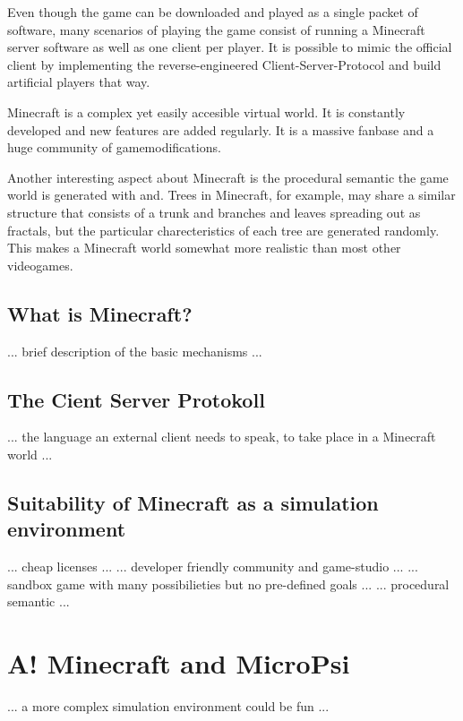 Even though the game can be downloaded and played as a single packet of software, many scenarios of playing the game consist of running a Minecraft server software as well as one client per player. It is possible to mimic the official client by implementing the reverse-engineered Client-Server-Protocol and build artificial players that way.

Minecraft is a complex yet easily accesible virtual world. It is constantly developed and new features are added regularly. It is a massive fanbase and a huge community of gamemodifications.

Another interesting aspect about Minecraft is the procedural semantic the game world is generated with and. Trees in Minecraft, for example, may share a similar structure that consists of a trunk and branches and leaves spreading out as fractals, but the particular charecteristics of each tree are generated randomly. This makes a Minecraft world somewhat more realistic than most other videogames.

        \subsection{What is Minecraft?}
... brief description of the basic mechanisms ...

        \subsection{The Cient Server Protokoll}
... the language an external client needs to speak, to take place in a Minecraft world ...

        \subsection{Suitability of Minecraft as a simulation environment}
... cheap licenses ...
... developer friendly community and game-studio ...
... sandbox game with many possibilieties but no pre-defined goals ...
... procedural semantic ...

    \section{A! Minecraft and MicroPsi}
... a more complex simulation environment could be fun ...
